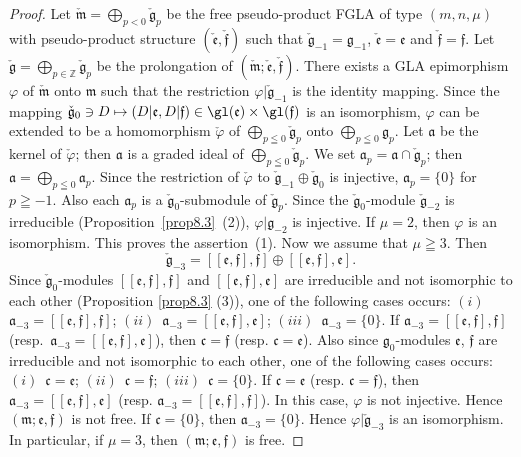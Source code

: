\begin{proof}
Let
$\check{\mathfrak m}=\bigoplus_{p<0}\limits\check{\mathfrak g}_p$
be the free pseudo-product FGLA of type $(m,n,\mu)$
with pseudo-product structure
$(\check{\mathfrak e},\check{\mathfrak f})$ such that
$\check{\mathfrak g}_{-1}=\mathfrak g_{-1}$,
$\check{\mathfrak e}=\mathfrak e$ and $\check{\mathfrak f}=\mathfrak f$.
Let $\check{\mathfrak g}=\bigoplus_{p\in\mathbb Z}\limits\check{\mathfrak g}_p$  be the prolongation of $(\check{\mathfrak m};\check{\mathfrak e},\check{\mathfrak f})$.
There exists a GLA epimorphism $\varphi$
of $\check{\mathfrak m}$ onto $\mathfrak m$ such that the restriction
$\varphi|\check{\mathfrak g}_{-1}$ is the identity mapping.
Since the mapping
$\check{\mathfrak g}_0\ni D\mapsto
(D|\mathfrak e,D|\mathfrak f)\in\gl(\mathfrak e)\times\gl(\mathfrak f)$
is an isomorphism,
$\varphi$ can be extended to be a homomorphism $\check{\varphi}$
of $\bigoplus\limits_{p\leqq0}\check{\mathfrak g}_{p}$ onto
$\bigoplus\limits_{p\leqq0}\mathfrak g_p$.
Let $\mathfrak a$ be the kernel of $\check{\varphi}$;
then $\mathfrak a$ is a graded ideal of
$\bigoplus\limits_{p\leqq0}\check{\mathfrak g}_{p}$.
We set $\mathfrak a_p
=\mathfrak a\cap \check{\mathfrak g}_{p}$; then
$\mathfrak a=\bigoplus\limits_{p\leqq 0}\mathfrak a_p$.
Since the restriction of $\check{\varphi}$ to
$\check{\mathfrak g}_{-1}\oplus \check{\mathfrak g}_0$ is injective,
$\mathfrak a_p=\{0\}$ for $p\geqq-1$. Also
each $\mathfrak a_p$ is a $\check{\mathfrak g}_0$-submodule of
$\check{\mathfrak g}_p$.
Since the $\check{\mathfrak g}_0$-module
$\check{\mathfrak g}_{-2}$ is irreducible (Proposition~\ref{prop8.3}~(2)),
$\varphi|\mathfrak g_{-2}$ is injective.
If $\mu=2$, then $\varphi$ is an isomorphism. This proves the assertion~(1).
Now we assume that $\mu\geqq3$. Then
\[
\check{\mathfrak g}_{-3}=[[\mathfrak e,\mathfrak f],\mathfrak f]\oplus
[[\mathfrak e,\mathfrak f],\mathfrak e].
\]
Since $\check{\mathfrak g}_0$-modules
$[[\mathfrak e,\mathfrak f],\mathfrak f]$ and
$[[\mathfrak e,\mathfrak f],\mathfrak e]$ are irreducible and not isomorphic
to each other (Proposition \ref{prop8.3} (3)),
one of the following cases occurs:
$(i)$~$\mathfrak a_{-3}=[[\mathfrak e,\mathfrak f],\mathfrak f]$;
$(ii)$~$\mathfrak a_{-3}=[[\mathfrak e,\mathfrak f],\mathfrak e]$;
$(iii)$~$\mathfrak a_{-3}=\{0\}$.
If $\mathfrak a_{-3}=[[\mathfrak e,\mathfrak f],\mathfrak f]$ (resp.\
$\mathfrak a_{-3}=[[\mathfrak e,\mathfrak f],\mathfrak e]$), then
$\mathfrak c=\mathfrak f$
(resp. $\mathfrak c=\mathfrak e$).
Also
since $\mathfrak g_0$-modules
$\mathfrak e$,
$\mathfrak f$ are irreducible and not isomorphic to each other,
one of the following cases occurs:
$(i)$~$\mathfrak c=\mathfrak e$;
$(ii)$~$\mathfrak c=\mathfrak f$;
$(iii)$~$\mathfrak c=\{0\}$.
If $\mathfrak c=\mathfrak e$
(resp. $\mathfrak c=\mathfrak f$),
then $\mathfrak a_{-3}=[[\mathfrak e,\mathfrak f],\mathfrak e]$
(resp. $\mathfrak a_{-3}=[[\mathfrak e,\mathfrak f],\mathfrak f]$).
In this case, $\varphi$ is not injective.
Hence $(\mathfrak m;\mathfrak e,\mathfrak f)$ is not free.
If $\mathfrak c=\{0\}$,
then $\mathfrak a_{-3}=\{0\}$.
Hence $\varphi|\check{\mathfrak g}_{-3}$ is an isomorphism.
In particular, if $\mu=3$, then
$(\mathfrak m;\mathfrak e,\mathfrak f)$ is free.
\end{proof}

